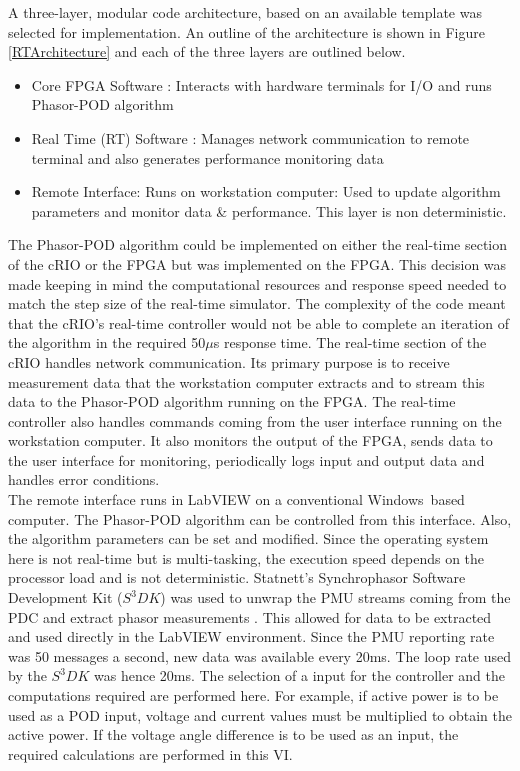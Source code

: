 \documentclass[journal]{IEEEtran}
\begin{document}
A three-layer, modular code architecture, based on an available template \cite{LabviewTemplate} was selected for implementation. An outline of the architecture is shown in Figure \ref{RTArchitecture} and each of the three layers are outlined below. 

\begin{itemize}
\item Core FPGA Software : Interacts with hardware terminals for I/O and runs Phasor-POD algorithm

\item Real Time (RT) Software : Manages network communication to remote terminal and also generates performance monitoring data

\item Remote Interface: Runs on workstation computer: Used to update algorithm parameters and monitor data \& performance. This layer is non deterministic.
\end{itemize}

The Phasor-POD algorithm could be implemented on either the real-time section of the cRIO or the FPGA but was implemented on the FPGA. This decision was made keeping in mind the computational resources and response speed needed to match the step size of the real-time simulator. The complexity of the code meant that the cRIO\rq{s} real-time controller would not be able to complete an iteration of the algorithm in the required 50$\mu$s response time. The real-time section of the cRIO handles network communication. Its primary purpose is to receive measurement data that the workstation computer extracts and to stream this data to the Phasor-POD algorithm running on the FPGA. The real-time controller also handles commands coming from the user interface running on the workstation computer.  It also monitors the output of the FPGA, sends data to the user interface for monitoring, periodically logs input and output data and handles error  conditions.\\

The remote interface runs in LabVIEW on a conventional Windows\textregistered~based computer. The Phasor-POD algorithm can be controlled from this interface. Also, the algorithm parameters can be set and modified. Since the operating system here is not real-time but is multi-tasking, the execution speed depends on the processor load and is not deterministic. Statnett's Synchrophasor Software Development Kit ($S^{3}DK$) was used to unwrap the PMU streams coming from the PDC and extract phasor measurements \cite{SDK}. This allowed for data to be extracted and used directly in the LabVIEW environment. Since the PMU reporting rate was 50 messages a second, new data was available every 20ms. The loop rate used by the $S^{3}DK$ was hence 20ms. The selection of a input for the controller and the computations required are performed here. For example, if active power is to be used as a POD input, voltage and current values must be multiplied to obtain the active power. If the voltage angle difference is to be used as an input, the required calculations are performed in this VI.\\
\end{document}
